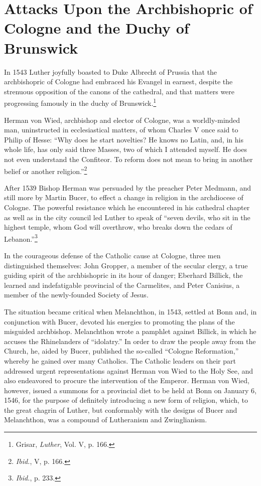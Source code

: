 \section{Attacks Upon the Archbishopric of Cologne and the Duchy of Brunswick}

In 1543 Luther joyfully boasted to Duke Albrecht of Prussia that
the archbishopric of Cologne had embraced his Evangel in earnest,
despite the strenuous opposition of the canons of the cathedral, and
that matters were progressing famously in the duchy of Brunswick.\footnote{Grisar, \textit{Luther}, Vol. V, p. 166.}

Herman von Wied, archbishop and elector of Cologne, was a
worldly-minded man, uninstructed in ecclesiastical matters, of whom
Charles V once said to Philip of Hesse: “Why does he start novelties?
He knows no Latin, and, in his whole life, has only said three Masses,
two of which I attended myself. He does not even understand the
Confiteor. To reform does not mean to bring in another belief or
another religion.”\footnote{\textit{Ibid.}, V, p. 166.}

After 1539 Bishop Herman was persuaded by the preacher Peter
Medmann, and still more by Martin Bucer, to effect a change in religion
in the archdiocese of Cologne. The powerful resistance which
he encountered in his cathedral chapter as well as in the city council
led Luther to speak of “seven devils, who sit in the highest temple,
whom God will overthrow, who breaks down the cedars of Lebanon.”\footnote{\textit{Ibid.}, p. 233.}

In the courageous defense of the Catholic cause at Cologne,
three men distinguished themselves: John Gropper, a member of the
secular clergy, a true guiding spirit of the archbishopric in its hour
of danger; Eberhard Billick, the learned and indefatigable provincial
of the Carmelites, and Peter Canisius, a member of the newly-founded
Society of Jesus.

The situation became critical when Melanchthon, in 1543, settled
at Bonn and, in conjunction with Bucer, devoted his energies to promoting
the plans of the misguided archbishop. Melanchthon wrote a
pamphlet against Billick, in which he accuses the Rhinelanders of
“idolatry.” In order to draw the people away from the Church, he,
aided by Bucer, published the so-called “Cologne Reformation,”
whereby he gained over many Catholics. The Catholic leaders on
their part addressed urgent representations against Herman von
Wied to the Holy See, and also endeavored to procure the intervention
of the Emperor. Herman von Wied, however, issued a summons for a provincial
diet to be held at Bonn on January 6, 1546,
for the purpose of definitely introducing a new form of religion,
which, to the great chagrin of Luther, but conformably with the
designs of Bucer and Melanchthon, was a compound of Lutheranism
and Zwinglianism.

